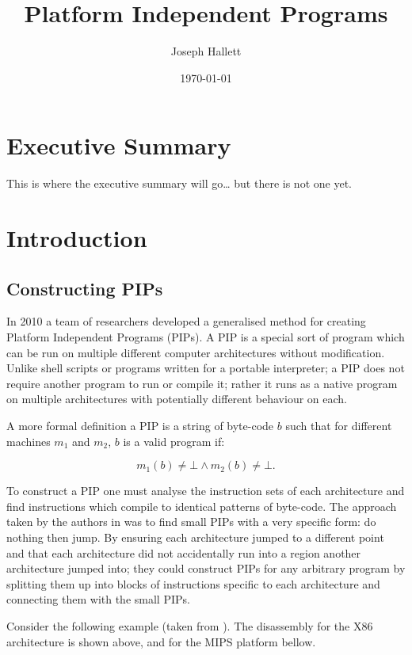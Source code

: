 \documentclass[10pt,]{book}
\title{Platform Independent Programs}
\author{Joseph Hallett}
\date{\today}
\begin{document}
\maketitle

\tableofcontents
\listoftables
\lstlistoflistings
\chapter{Executive Summary}

This is where the executive summary will go\ldots{} but there is not one
yet.

\chapter{Introduction}

\section{Constructing PIPs}

In 2010 a team of researchers developed a generalised method for
creating Platform Independent Programs (PIPs)\autocite{Cha:2010uh}. A
PIP is a special sort of program which can be run on multiple different
computer architectures without modification. Unlike shell scripts or
programs written for a portable interpreter; a PIP does not require
another program to run or compile it; rather it runs as a native program
on multiple architectures with potentially different behaviour on each.

A more formal definition a PIP is a string of byte-code $b$ such that
for different machines $m_1$ and $m_2$, $b$ is a valid program if:

\[m_1(b) \not = \bot \wedge m_2(b) \not =\bot.\]

To construct a PIP one must analyse the instruction sets of each
architecture and find instructions which compile to identical patterns
of byte-code. The approach taken by the authors in \autocite{Cha:2010uh}
was to find small PIPs with a very specific form: do nothing then jump.
By ensuring each architecture jumped to a different point and that each
architecture did not accidentally run into a region another architecture
jumped into; they could construct PIPs for any arbitrary program by
splitting them up into blocks of instructions specific to each
architecture and connecting them with the small PIPs.

Consider the following example (taken from \autocite{Cha:2010uh}). The
disassembly for the X86 architecture is shown above, and for the MIPS
platform bellow.
\end{document}
